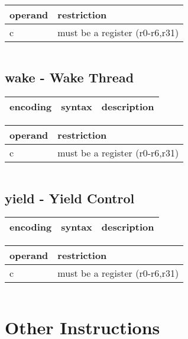 \documentclass[letterpaper,10pt,openright,twoside,onecolumn]{book}
\begin{document}
  \flushleft
  \begin{tabular}{|l|l|}
   \hline
    operand & restriction \\
   \hline
    c & must be a register (r0-r6,r31) \\
   \hline
  \end{tabular}
  \begin{verbatim}
  \end{verbatim}
\newpage\subsection{wake - Wake Thread}
  \begin{tabular}{|l|l|l|}
   \hline
    encoding & syntax & description \\
   \hline
   \hline
  \end{tabular}
  \flushleft
  \begin{tabular}{|l|l|}
   \hline
    operand & restriction \\
   \hline
    c & must be a register (r0-r6,r31) \\
   \hline
  \end{tabular}
  \begin{verbatim}
  \end{verbatim}
\newpage\subsection{yield - Yield Control}
  \begin{tabular}{|l|l|l|}
   \hline
    encoding & syntax & description \\
   \hline
   \hline
  \end{tabular}
  \flushleft
  \begin{tabular}{|l|l|}
   \hline
    operand & restriction \\
   \hline
    c & must be a register (r0-r6,r31) \\
   \hline
  \end{tabular}
  \begin{verbatim}
  \end{verbatim}

\clearpage\section{Other Instructions}
\end{document}
